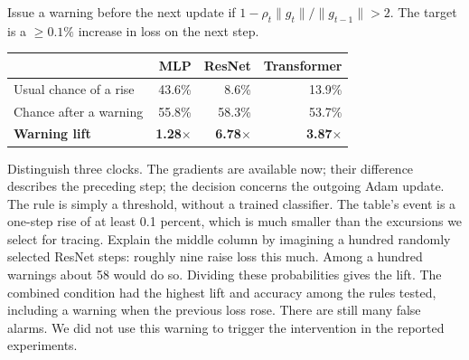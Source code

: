 {\small Issue a warning before the next update if
\(1-\rho_t\|g_t\|/\|g_{t-1}\|>2\).
The target is a \(\geq 0.1\%\) increase in loss on the next step.
\begin{center}\renewcommand{\arraystretch}{1.24}
\begin{tabular}{@{}lrrr@{}}\toprule
& MLP & ResNet & Transformer\\\midrule
Usual chance of a rise & 43.6\% & 8.6\% & 13.9\%\\
Chance after a warning & 55.8\% & 58.3\% & 53.7\%\\
\textbf{Warning lift} & \textbf{1.28\(\times\)} & \textbf{6.78\(\times\)} & \textbf{3.87\(\times\)}\\\bottomrule
\end{tabular}\end{center}
}
{Distinguish three clocks. The gradients are available now; their difference describes the preceding step; the decision concerns the outgoing Adam update. The rule is simply a threshold, without a trained classifier. The table's event is a one-step rise of at least 0.1 percent, which is much smaller than the excursions we select for tracing. Explain the middle column by imagining a hundred randomly selected ResNet steps: roughly nine raise loss this much. Among a hundred warnings about 58 would do so. Dividing these probabilities gives the lift. The combined condition had the highest lift and accuracy among the rules tested, including a warning when the previous loss rose. There are still many false alarms. We did not use this warning to trigger the intervention in the reported experiments.}

